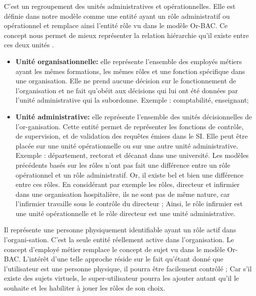 \label{sectionComposantHOr-BAC}

\label{sectionComposantHOr-BACuo}

C'est un regroupement des unités administratives et opérationnelles. Elle est définie dans notre modèle comme une entité ayant un rôle administratif ou opérationnel et remplace ainsi l'entité rôle vu dans le modèle Or-BAC. Ce concept nous permet de mieux représenter la relation hiérarchie qu'il existe entre ces deux unités \cite{theseBenoit}. 

\begin{itemize}
\item \textbf{Unité organisationnelle:} elle représente l'ensemble des employés métiers ayant les mêmes formations, les mêmes rôles et une fonction spécifique dans une organisation. Elle ne prend aucune décision sur le fonctionnement de l'organisation et ne fait qu'obéit aux décisions qui lui ont été données par l'unité administrative qui la subordonne. Exemple : comptabilité, enseignant; 
\item \textbf{Unité administrative:} elle représente l'ensemble des unités décisionnelles de l'or-ganisation. Cette entité permet de représenter les fonctions de contrôle, de supervision, et de validation des requêtes émises dans le SI. Elle peut être placée sur une unité opérationnelle ou sur une autre unité administrative. Exemple : département, rectorat et décanat dans une université. Les modèles précédents basés sur les rôles n'ont pas fait une différence entre un rôle opérationnel et un rôle administratif. Or, il existe bel et bien une différence entre ces rôles. En considérant par exemple les rôles,  directeur et infirmier dans une organisation hospitalière, ils ne sont pas de même nature, car l'infirmier travaille sous le contrôle du directeur ; Ainsi, le rôle infirmier est une unité opérationnelle et le rôle directeur est une unité administrative.
\end{itemize}

\label{sectionComposantHOr-BACEM}

Il représente une personne physiquement identifiable ayant un rôle actif dans l'organi-sation. C'est la seule entité réellement active dans l'organisation. Le concept d'employé métier remplace le concept de sujet vu dans le modèle Or-BAC. L'intérêt d'une telle approche réside sur le fait qu'étant donné que l'utilisateur est une personne physique, il pourra être facilement contrôlé ; Car s'il existe des sujets virtuels, le super-utilisateur pourra les ajouter autant qu'il le souhaite et les habiliter à jouer les rôles de son choix.

